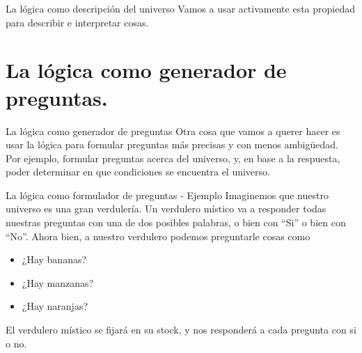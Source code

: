 
\begin{frame}{La lógica como descripción del universo}
  \jump
  Vamos a usar activamente esta propiedad para describir e interpretar cosas.
\end{frame}


\section{La lógica como generador de preguntas.}


\begin{frame}{La lógica como generador de preguntas}
  Otra cosa que vamos a querer hacer es usar la lógica para formular
  preguntas más precisas y con menos ambigüedad.
  \jump
  Por ejemplo, formular preguntas acerca del universo, y, en base a la
  respuesta, poder determinar en que condiciones se encuentra el universo.
\end{frame}


\begin{frame}{La lógica como formulador de preguntas - Ejemplo}
  Imaginemos que nuestro universo es una gran verdulería. Un verdulero místico
  va a responder todas nuestras preguntas con una de dos posibles palabras,
  o bien con ``Si'' o bien con ``No''.
  \jump
  Ahora bien, a nuestro verdulero podemos preguntarle cosas como
  \begin{itemize}
    \item ¿Hay bananas?
    \item ¿Hay manzanas?
    \item ¿Hay naranjas?
  \end{itemize}
  El verdulero místico se fijará en su stock, y nos responderá a cada pregunta
  con si o no.
\end{frame}


